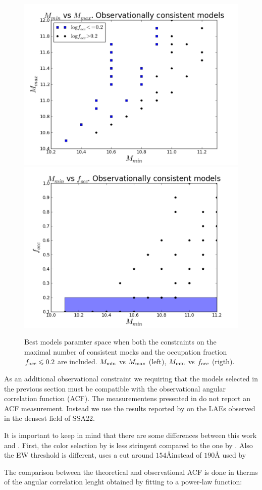 \documentclass[usenatbib]{mn2e}
\begin{document}
\begin{figure}
\begin{center}
\includegraphics[width=0.46\linewidth,angle=0]{./plots/mmin_vs_mmax.pdf}
\hspace{5mm}
\includegraphics[width=0.46\linewidth,angle=0]{./plots/mmin_vs_focc.pdf}
\end{center}
\caption{Best models paramter space when both the constraints on the
  maximal number of  consistent mocks and the occupation  fraction
  $f_{\rm occ}\leq  0.2$ are included. $M_{\rm min}$ vs $M_{\rm max}$
  (left), $M_{\rm min}$ vs $f_{\rm occ}$ (rigth).
  \label{fig:restriction_mock_and_f_occ_corr}} 
\end{figure} 

As an additional observational constraint we requiring that the models
selected in the previous section must be compatible with the
observational angular correlation function (ACF). The measurementens
presented in \citep{Yamada2012} do not report an ACF
measurement. Instead we use the results reported by
\citep{Hayashino2004} on the LAEs observed in the densest field of
SSA22.    
  
It is important to keep in mind that there are some differences
between this work and \citep{Yamada2012}. First, the color selection by
\cite{Yamada2012} is less stringent compared to the one by
\cite{Hayashino2004}. Also the EW threshold is different,
\cite{Hayashino2004} uses a cut around $154$\AA instead of $190$\AA
used by \citep{Yamada2012}

The comparison between the theoretical and observational ACF is done in
therms of the angular correlation lenght obtained  by fitting to a power-law
function:  
\end{document}
